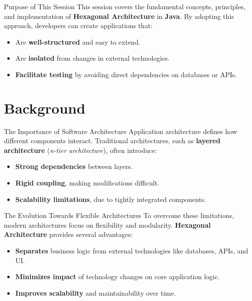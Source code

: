 \documentclass[aspectratio=169, table]{beamer}
\begin{document}
\begin{frame}[fragile]{Purpose of This Session}
	\vspace{20pt}
	This session covers the fundamental concepts, principles, and implementation of \textbf{Hexagonal Architecture} in \textbf{Java}. By adopting this approach, developers can create applications that:
	\begin{itemize}
		\item Are \textbf{well-structured} and easy to extend.
		\item Are \textbf{isolated} from changes in external technologies.
		\item \textbf{Facilitate testing} by avoiding direct dependencies on databases or APIs.
	\end{itemize}
\end{frame}

\section{Background}

\begin{frame}[fragile]{The Importance of Software Architecture}
	\vspace{20pt}
	Application architecture defines how different components interact. Traditional architectures, such as \textbf{layered architecture} (\textit{n-tier architecture}), often introduce:
	\begin{itemize}
		\item \textbf{Strong dependencies} between layers.
		\item \textbf{Rigid coupling}, making modifications difficult.
		\item \textbf{Scalability limitations}, due to tightly integrated components.
	\end{itemize}
\end{frame}

\begin{frame}[fragile]{The Evolution Towards Flexible Architectures}
	\vspace{20pt}
	To overcome these limitations, modern architectures focus on flexibility and modularity. \textbf{Hexagonal Architecture} provides several advantages:
	\begin{itemize}
		\item \textbf{Separates} business logic from external technologies like databases, APIs, and UI.
		\item \textbf{Minimizes impact} of technology changes on core application logic.
		\item \textbf{Improves scalability} and maintainability over time.
	\end{itemize}
\end{frame}
\end{document}

